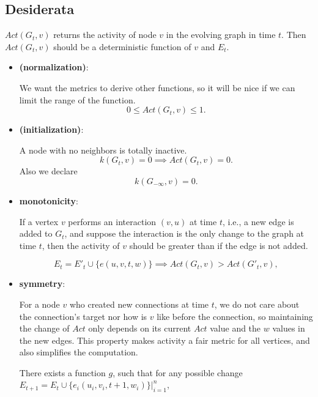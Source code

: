 \documentclass[12pt,abstract=true]{scrartcl}
\numberwithin{equation}{section}
\theoremstyle{definition}   \newtheorem{definition}{Definition}[section]
\theoremstyle{plain}        \newtheorem{theorem}{Theorem}[section]
\theoremstyle{plain}        \newtheorem{observation}{Observation}[section]
\theoremstyle{plain}        \newtheorem{fact}{Fact}[section]
\theoremstyle{plain}        \newtheorem{claim}{Claim}[section]
\theoremstyle{plain}        \newtheorem{lemma}[theorem]{Lemma}
\theoremstyle{plain}        \newtheorem{corollary}[theorem]{Corollary}
\theoremstyle{remark}       \newtheorem{example}{Example}[section]
\theoremstyle{remark}       \newtheorem{remark}{Remark}[section]
\begin{document}
\subsection{Desiderata}
 $\mathit{Act}(G_t,v)$ returns the activity of node $v$ in the evolving graph in
time $t$. Then $\mathit{Act}(G_t,v)$ should be a deterministic function of $v$ and
$E_t$.
\begin{itemize}
\item \textbf{(normalization)}:

We want the metrics to derive other functions, so it will be nice if we can
limit the range of the function.
\begin{equation}
0\leq \mathit{Act}(G_t,v) \leq 1.
\end{equation}

\item \textbf{(initialization)}:

A node with no neighbors is totally inactive.
\begin{equation}
k(G_t,v)=0\implies \mathit{Act}(G_t,v)=0.
\end{equation}
Also we declare
\begin{equation}
k(G_{-\infty},v)=0.
\end{equation}

\item \textbf{monotonicity}:

If a vertex $v$ performs an interaction $(v,u)$ at time $t$, i.e., a new edge
is added to $G_t$, and suppose the interaction is the only change to the graph
at time $t$, then the activity of $v$ should be greater than if the edge is not
added.

\begin{equation}
E_t=E'_t\cup\{e(u,v,t,w)\}\implies \mathit{Act}(G_{t},v)>\mathit{Act}(G'_{t},v
),\label{eq-mono}
\end{equation}

\item \textbf{symmetry}:

For a node $v$ who created new connections at time $t$, we do not care about
the connection's target nor how is $v$ like before the connection, so
maintaining the change of $\mathit{Act}$ only depends on its current
$\mathit{Act}$ value and the $w$ values in the new edges. This property makes
activity a fair metric for all vertices, and also simplifies the computation.

There exists a function $g$, such that for any possible change
$E_{t+1}=E_t\cup\{e_i(u_i,v_i,t+1,w_i)\}|_{i=1}^n$,


\end{itemize}
\end{document}
